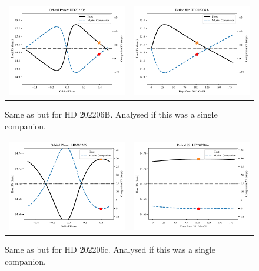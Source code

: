 \begin{figure}
    \centering
    \begin{tabular}{cc}
        \includegraphics[width=0.45\linewidth]{figures/direct-recovery/orbital-plots/HD202206B_orbital_phase.pdf}&
        \includegraphics[width=0.45\linewidth]{figures/direct-recovery/orbital-plots/HD202206B_p89.pdf}\\
    \end{tabular}
    \caption{Same as  but for HD 202206B. Analysed if this was a single companion.}
    \label{fig:hd202206bp89}
\end{figure}

\begin{figure}
    \centering
    \begin{tabular}{cc}
        \includegraphics[width=0.45\linewidth]{figures/direct-recovery/orbital-plots/HD202206c_orbital_phase.pdf}&
        \includegraphics[width=0.45\linewidth]{figures/direct-recovery/orbital-plots/HD202206c_p89.pdf}\\
    \end{tabular}
    \caption{Same as  but for HD 202206c. Analysed if this was a single companion. }
    \label{fig:hd202206cp89}
\end{figure}

